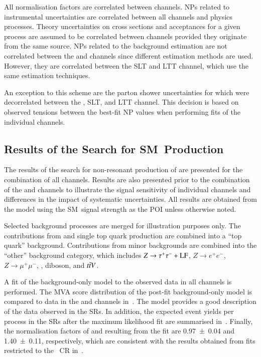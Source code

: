 All normalisation factors are correlated between channels. NPs related to
instrumental uncertainties are correlated between all channels and physics
processes. Theory uncertainties on cross sections and acceptances for a given
process are assumed to be correlated between channels provided they originate
from the same source. NPs related to the \faketauhadvis background estimation
are not correlated between the \hadhad and \lephad channels since different
estimation methods are used. However, they are correlated between the \lephad
SLT and LTT channel, which use the same estimation techniques.

An exception to this scheme are the parton shower uncertainties for \ttbar which
were decorrelated between the \hadhad, \lephad SLT, and \lephad LTT
channel. This decision is based on observed tensions between the best-fit NP
values when performing fits of the individual channels.



\subsection{Results of the Search for SM~\HH Production}%
\label{sec:results_nonres}

The results of the search for non-resonant production of \HH are presented for
the combination of all channels. Results are also presented prior to the
combination of the \hadhad and \lephad channels to illustrate the signal
sensitivity of individual channels and differences in the impact of systematic
uncertainties. All results are obtained from the model using the SM~\HH signal
strength as the POI unless otherwise noted.

Selected background processes are merged for illustration purposes only. The
contributions from \ttbar and single top quark production are combined into a
``top quark'' background. Contributions from minor backgrounds are combined into
the ``other'' background category, which includes $Z \to \tau^{+} \tau^{-} + \text{LF}$,
$Z \to e^{+}e^{-}$, $Z \to \mu^{+}\mu^{-}$,
\Wjets, diboson, and $t\bar{t} V$.

A fit of the background-only model to the observed data in all channels is
performed. The MVA score distribution of the post-fit background-only model is
compared to data in the \hadhad and \lephad channels
in~. The model provides a good description of the
data observed in the SRs. In addition, the expected event yields per process in
the SRs after the maximum likelihood fit are summarised
in~. Finally, the normalisation factors of \ttbar
and \ZHF resulting from the fit are \num{0.97 +- 0.04} and \num{1.40 +- 0.11},
respectively, which are consistent with the results obtained from fits
restricted to the \ZHF~CR in~.

